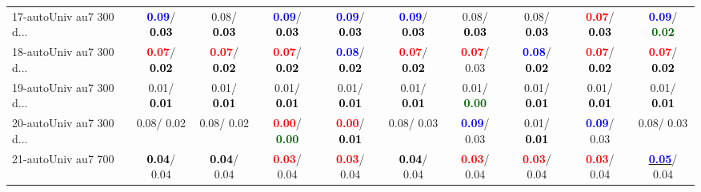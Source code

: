 \begin{table}[h]
\begin{center}
{\begin{tabular}{lc|c|c|c|c|c|c|c|c}
17-autoUniv au7 300 d... & \textcolor{blue}{\textbf{  0.09}}/\textcolor{black}{\textbf{  0.03}} &   0.08/\textcolor{black}{\textbf{  0.03}} & \textcolor{blue}{\textbf{  0.09}}/\textcolor{black}{\textbf{  0.03}} & \textcolor{blue}{\textbf{  0.09}}/\textcolor{black}{\textbf{  0.03}} & \textcolor{blue}{\textbf{  0.09}}/\textcolor{black}{\textbf{  0.03}} &   0.08/\textcolor{black}{\textbf{  0.03}} &   0.08/\textcolor{black}{\textbf{  0.03}} & \textcolor{red}{\textbf{  0.07}}/\textcolor{black}{\textbf{  0.03}} & \textcolor{blue}{\textbf{  0.09}}/\textcolor{darkgreen}{\textbf{  0.02}} \\
18-autoUniv au7 300 d... & \textcolor{red}{\textbf{  0.07}}/\textcolor{black}{\textbf{  0.02}} & \textcolor{red}{\textbf{  0.07}}/\textcolor{black}{\textbf{  0.02}} & \textcolor{red}{\textbf{  0.07}}/\textcolor{black}{\textbf{  0.02}} & \textcolor{blue}{\textbf{  0.08}}/\textcolor{black}{\textbf{  0.02}} & \textcolor{red}{\textbf{  0.07}}/\textcolor{black}{\textbf{  0.02}} & \textcolor{red}{\textbf{  0.07}}/  0.03 & \textcolor{blue}{\textbf{  0.08}}/\textcolor{black}{\textbf{  0.02}} & \textcolor{red}{\textbf{  0.07}}/\textcolor{black}{\textbf{  0.02}} & \textcolor{red}{\textbf{  0.07}}/\textcolor{black}{\textbf{  0.02}} \\
19-autoUniv au7 300 d... &   0.01/\textcolor{black}{\textbf{  0.01}} &   0.01/\textcolor{black}{\textbf{  0.01}} &   0.01/\textcolor{black}{\textbf{  0.01}} &   0.01/\textcolor{black}{\textbf{  0.01}} &   0.01/\textcolor{black}{\textbf{  0.01}} &   0.01/\textcolor{darkgreen}{\textbf{  0.00}} &   0.01/\textcolor{black}{\textbf{  0.01}} &   0.01/\textcolor{black}{\textbf{  0.01}} &   0.01/\textcolor{black}{\textbf{  0.01}} \\
20-autoUniv au7 300 d... &   0.08/  0.02 &   0.08/  0.02 & \textcolor{red}{\textbf{  0.00}}/\textcolor{darkgreen}{\textbf{  0.00}} & \textcolor{red}{\textbf{  0.00}}/\textcolor{black}{\textbf{  0.01}} &   0.08/  0.03 & \textcolor{blue}{\textbf{  0.09}}/  0.03 &   0.01/\textcolor{black}{\textbf{  0.01}} & \textcolor{blue}{\textbf{  0.09}}/  0.03 &   0.08/  0.03 \\
21-autoUniv au7 700 & \textcolor{black}{\textbf{  0.04}}/  0.04 & \textcolor{black}{\textbf{  0.04}}/  0.04 & \textcolor{red}{\textbf{  0.03}}/  0.04 & \textcolor{red}{\textbf{  0.03}}/  0.04 & \textcolor{black}{\textbf{  0.04}}/  0.04 & \textcolor{red}{\textbf{  0.03}}/  0.04 & \textcolor{red}{\textbf{  0.03}}/  0.04 & \textcolor{red}{\textbf{  0.03}}/  0.04 & \underline{\textcolor{blue}{\textbf{  0.05}}}/  0.04 \\ \hline

\end{tabular}}
\end{center}
\end{table}
